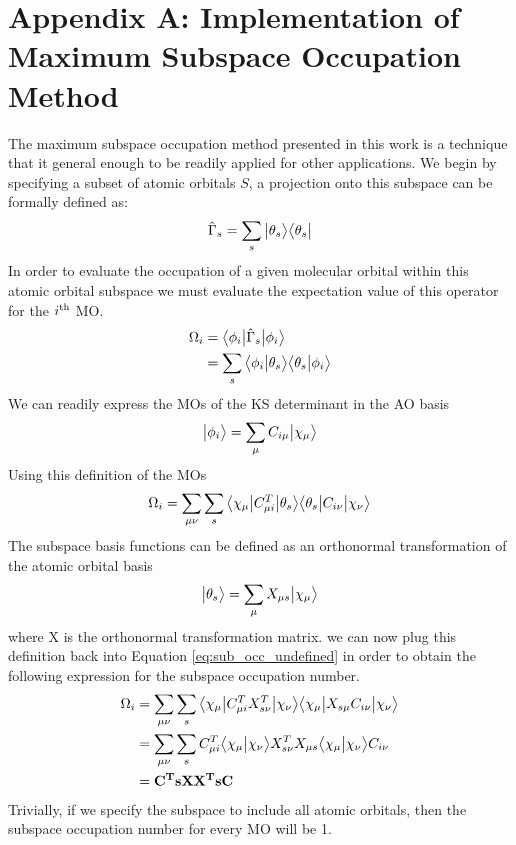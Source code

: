 \documentclass{article}
\begin{document}
\section*{Appendix A: Implementation of Maximum Subspace Occupation Method}
The maximum subspace occupation method presented in this work is a technique that it general enough to be readily applied for other applications. We begin by specifying a subset of atomic orbitals $S$, a projection onto this subspace can be formally defined as:
\begin{align}
\hat{\Gamma}_{s} = \sum_{s}\ket[1]{\theta_{s}}\bra[1]{\theta_{s}}
\end{align}
In order to evaluate the occupation of a given molecular orbital within this atomic orbital subspace we must evaluate the expectation value of this operator for the $i^{\rm th}$ MO. 
\begin{align}
\Omega_{i} &= \bra[1]{\phi_i} \hat{\Gamma}_{s} \ket[1]{\phi_i} \\
&= \sum_s \braket[1]{\phi_i}{\theta_{s}} \braket[1]{\theta_{s}}{\phi_i}
\end{align}
We can readily express the MOs of the KS determinant in the AO basis
\begin{align}
\ket[1]{\phi_i} = \sum_{\mu} C_{i \mu} \ket[1]{\chi_{\mu}}
\end{align}
Using this definition of the MOs 
\begin{equation}
\Omega_{i} = \sum_{\mu \nu} \sum_{s} \bra[1]{\chi_{\mu}} C_{\mu i}^T \ket[1]{\theta_{s}} \bra[1]{\theta_{s}} C_{i \nu} \ket[1]{\chi_{\nu}}
\label{eq:sub_occ_undefined}
\end{equation}
The subspace basis functions can be defined as an orthonormal transformation of the atomic orbital basis
\begin{align}
\ket[1]{\theta_{s}} = \sum_{\mu} X_{\mu s} \ket[1]{\chi_{\mu}}
\end{align}
where X is the orthonormal transformation matrix. we can now plug this definition back into Equation \ref{eq:sub_occ_undefined} in order to obtain the following expression for the subspace occupation number.
\begin{align}
\Omega_{i} &= \sum_{\mu \nu} \sum_{s} \bra[1]{\chi_{\mu}} C_{\mu i}^T X^T_{s \nu}\ket[1]{\chi_{\nu}} \bra[1]{\chi_{\mu}} X_{s \mu} C_{i \nu} \ket[1]{\chi_{\nu}} \\
&=  \sum_{\mu \nu} \sum_{s} C_{\mu i}^T \braket[1]{\chi_{\mu}}{\chi_{\nu}} X^T_{s \nu} X_{\mu s}  \braket[1]{\chi_{\mu}}{\chi_{\nu}} C_{i \nu} \\
&= \bf{C^T s X X^T s C}
\end{align}
Trivially, if we specify the subspace to include all atomic orbitals, then the subspace occupation number for every MO will be 1. 

{\footnotesize


}
\end{document}

